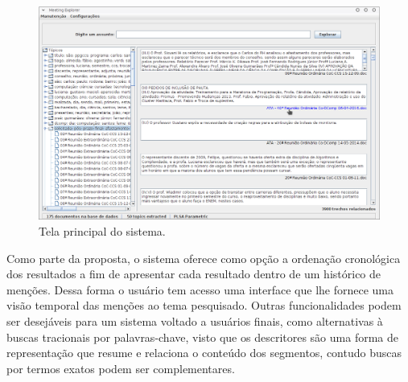   \begin{figure}[!h]
	  \centering
	  \includegraphics[width=\textwidth]{conteudo/capitulos/figs/tela-principal-2-1.png}
	  \caption{Tela principal do sistema.}
	  \label{fig:tela-principal}
  \end{figure}


Como parte da proposta, o sistema oferece como opção a ordenação cronológica dos resultados a fim de apresentar cada resultado dentro de um histórico de menções. Dessa forma o usuário tem acesso uma interface que lhe fornece uma visão temporal das menções ao tema pesquisado.
Outras funcionalidades podem ser desejáveis para um sistema voltado a usuários finais, como alternativas à buscas tracionais por palavras-chave, visto que os descritores são uma forma de representação que resume e relaciona o conteúdo dos segmentos, contudo buscas por termos exatos podem ser complementares. 





